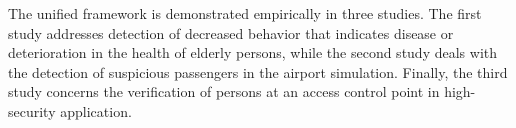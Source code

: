 %
%
The unified framework is demonstrated empirically in three studies. %
The first study addresses detection of decreased behavior that indicates disease or deterioration in the health of elderly persons, while the second study deals with the detection of suspicious passengers in the airport simulation. Finally, the third study concerns the verification of persons at an access control point in high-security application.



